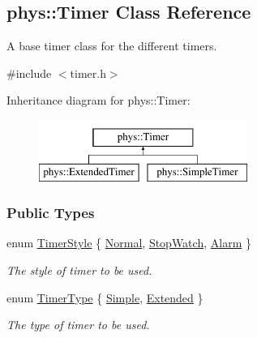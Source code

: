 \hypertarget{classphys_1_1Timer}{
\subsection{phys::Timer Class Reference}
\label{classphys_1_1Timer}
}


A base timer class for the different timers.  




{\ttfamily \#include $<$timer.h$>$}

Inheritance diagram for phys::Timer:\begin{figure}[H]
\begin{center}
\leavevmode
\includegraphics[height=2.000000cm]{classphys_1_1Timer}
\end{center}
\end{figure}
\subsubsection*{Public Types}
\begin{DoxyCompactItemize}
\item 
enum \hyperlink{classphys_1_1Timer_a1ee86bf43e20329d750c5d582dcce329}{TimerStyle} \{ \hyperlink{classphys_1_1Timer_a1ee86bf43e20329d750c5d582dcce329a5debd5b8437d14405bf25cd9b130449f}{Normal}, 
\hyperlink{classphys_1_1Timer_a1ee86bf43e20329d750c5d582dcce329a7599daa63100c2134df7d8b7c9b7f867}{StopWatch}, 
\hyperlink{classphys_1_1Timer_a1ee86bf43e20329d750c5d582dcce329ae9b9fa35767e4ac2c87c078e1d9a0729}{Alarm}
 \}
\begin{DoxyCompactList}\small\item\em The style of timer to be used. \item\end{DoxyCompactList}\item 
enum \hyperlink{classphys_1_1Timer_aacbbca9cc5543fc8414de59cd085c1c1}{TimerType} \{ \hyperlink{classphys_1_1Timer_aacbbca9cc5543fc8414de59cd085c1c1af8d1697e79f90f675fecc82e9aba7819}{Simple}, 
\hyperlink{classphys_1_1Timer_aacbbca9cc5543fc8414de59cd085c1c1aba207ea661f064c2041c73852c91efaa}{Extended}
 \}
\begin{DoxyCompactList}\small\item\em The type of timer to be used. \item\end{DoxyCompactList}\end{DoxyCompactItemize}
